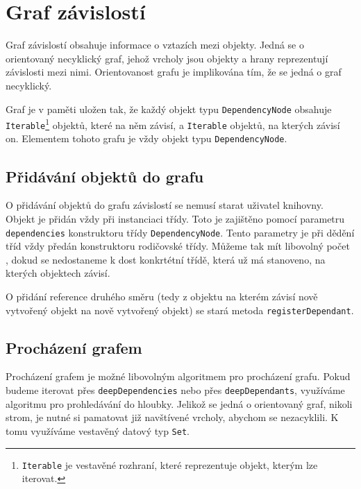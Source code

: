 \chapter{Graf závislostí}
\label{chap:dependency-graph}

Graf závislostí obsahuje informace o vztazích mezi  objekty.
Jedná se o orientovaný necyklický graf\cite{wikipedia:directed-graph}, jehož vrcholy jsou objekty a hrany reprezentují závislosti mezi nimi\cite{geometryjs:wiki:dependency-graph}.
Orientovanost grafu je implikována tím, že se jedná o graf necyklický.

Graf je v paměti uložen tak, že každý objekt typu \texttt{DependencyNode} obsahuje \texttt{Iterable}\footnote{\texttt{Iterable} je vestavěné rozhraní, které reprezentuje objekt, kterým lze iterovat.} objektů, které na něm závisí, a \texttt{Iterable} objektů, na kterých závisí on\cite[line 17, 21]{geometryjs:source:interfaces:dependencyNode.ts}.
Elementem tohoto grafu je vždy objekt typu \texttt{DependencyNode}.

\section[Přidávání objektů]{Přidávání objektů do grafu}
\label{sec:adding-objects-to-graph}

O přidávání objektů do grafu závislostí se nemusí starat uživatel knihovny.
Objekt je přidán vždy při instanciaci třídy.
Toto je zajištěno pomocí parametru \texttt{dependencies} konstruktoru třídy \texttt{DependencyNode}\cite[line 13-17]{geometryjs:source:geometryObjects:dependencyNode.ts}.
Tento parametry je při dědění tříd vždy předán konstruktoru rodičovské třídy. 
Můžeme tak mít libovolný počet , dokud se nedostaneme k dost konkrtétní třídě, která už má stanoveno, na kterých objektech závisí.

O přidání reference druhého směru (tedy z objektu na kterém závisí nově vytvořený objekt na nově vytvořený objekt) se stará metoda \texttt{registerDependant}\cite[line 32]{geometryjs:source:interfaces:dependencyNode.ts}.

\section[Procházení]{Procházení grafem}
\label{sec:traversing-the-graph}

Procházení grafem je možné libovolným algoritmem pro procházení grafu.
Pokud budeme iterovat přes \texttt{deepDependencies}\cite[line 17]{geometryjs:source:interfaces:dependencyNode.ts} nebo přes \texttt{deepDependants}\cite[line 21]{geometryjs:source:interfaces:dependencyNode.ts}, využíváme algoritmu pro prohledávání do hloubky\cite{wikipedia:depth-first-search}.
Jelikož se jedná o orientovaný graf, nikoli strom, je nutné si pamatovat již navštívené vrcholy, abychom se nezacyklili.
K tomu využíváme vestavěný datový typ \texttt{Set}.

